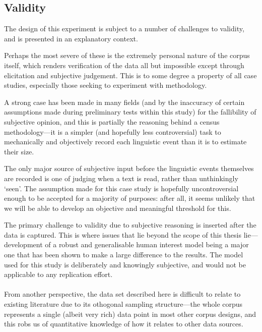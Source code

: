 








\subsection{Validity}
The design of this experiment is subject to a number of challenges to validity, and is presented in an explanatory context.

Perhaps the most severe of these is the extremely personal nature of the corpus itself, which renders verification of the data all but impossible except through elicitation and subjective judgement.  This is to some degree a property of all case studies, especially those seeking to experiment with methodology.

A strong case has been made in many fields (and by the inaccuracy of certain assumptions made during preliminary tests within this study) for the fallibility of subjective opinion, and this is partially the reasoning behind a census methodology---it is a simpler (and hopefully less controversial) task to mechanically and objectively record each linguistic event than it is to estimate their size.

The only major source of subjective input before the linguistic events themselves are recorded is one of judging when a text is read, rather than unthinkingly `seen'.  The assumption made for this case study is hopefully uncontroversial enough to be accepted for a majority of purposes: after all, it seems unlikely that we will be able to develop an objective and meaningful threshold for this.

The primary challenge to validity due to subjective reasoning is inserted after the data is captured.  This is where issues that lie beyond the scope of this thesis lie---development of a robust and generalisable human interest model being a major one that has been shown to make a large difference to the results.  The model used for this study is deliberately and knowingly subjective, and would not be applicable to any replication effort.

\paragraph{}
From another perspective, the data set described here is difficult to relate to existing literature due to its othogonal sampling structure---the whole corpus represents a single (albeit very rich) data point in most other corpus designs, and this robs us of quantitative knowledge of how it relates to other data sources.

